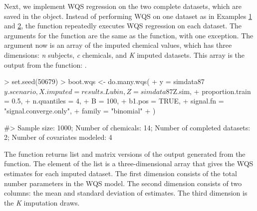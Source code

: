 Next, we implement WQS regression on the two complete datasets, which
are saved in the  object. Instead of performing WQS
on one dataset as in Examples \protect\hyperlink{Example-1}{1} and
\protect\hyperlink{Example-2}{2}, the  function
repeatedly executes WQS regression on each dataset. The arguments for
the  function are the same as the
 function, with one exception. The 
argument now is an array of the imputed chemical values, which has three
dimensions: \emph{n} subjects, \emph{c} chemicals, and \emph{K} imputed
datasets. This array is the output from the 
function: .

\begin{Schunk}
\begin{Sinput}
> set.seed(50679)
> boot.wqs <- do.many.wqs(
+   y = simdata87$y.scenario, X.imputed = results.Lubin, Z = simdata87$Z.sim,
+   proportion.train = 0.5, 
+   n.quantiles = 4, 
+   B = 100,
+   b1.pos = TRUE,
+   signal.fn = "signal.converge.only",
+   family = "binomial"
+ )
\end{Sinput}
\begin{Soutput}
#> Sample size: 1000; Number of chemicals: 14; 
Number of completed datasets: 2; Number of covariates modeled:  4
\end{Soutput}
\end{Schunk}

The  function returns list and matrix versions of
the output generated from the  function. The
 element of the  list is a
three-dimensional array that gives the WQS estimates for each imputed
dataset. The first dimension consists of the total number parameters in
the WQS model. The second dimension consists of two columns: the mean
and standard deviation of estimates. The third dimension is the \emph{K}
imputation draws.

